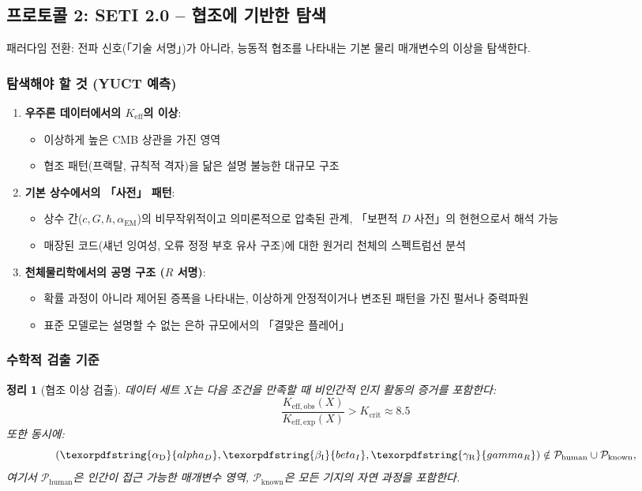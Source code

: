 \documentclass[11pt,a4paper]{article}
\newtheorem{theorem}{정리}
\DeclareRobustCommand{\alD}{\texorpdfstring{\ensuremath{\alpha_{\mathrm{D}}}}{alpha_D}}
\DeclareRobustCommand{\beI}{\texorpdfstring{\ensuremath{\beta_{\mathrm{I}}}}{beta_I}}
\DeclareRobustCommand{\gaR}{\texorpdfstring{\ensuremath{\gamma_{\mathrm{R}}}}{gamma_R}}
\newcommand{\eff}{\mathrm{eff}}
\newcommand{\Ke}{K_{\eff}}
\newcommand{\Keobs}{K_{\eff,\mathrm{obs}}}
\newcommand{\Keexp}{K_{\eff,\mathrm{exp}}}
\newcommand{\Kcrit}{K_{\mathrm{crit}}}
\begin{document}
	\subsection{프로토콜 2: SETI 2.0 -- 협조에 기반한 탐색}
	
	패러다임 전환: 전파 신호(「기술 서명」)가 아니라, 능동적 협조를 나타내는 기본 물리 매개변수의 이상을 탐색한다.
	
	\subsubsection{탐색해야 할 것 (YUCT 예측)}
	
	\begin{enumerate}
		\item \textbf{우주론 데이터에서의 \(\Ke\)의 이상}:
		\begin{itemize}
			\item 이상하게 높은 CMB 상관을 가진 영역
			\item 협조 패턴(프랙탈, 규칙적 격자)을 닮은 설명 불능한 대규모 구조
		\end{itemize}
		
		\item \textbf{기본 상수에서의 「사전」 패턴}:
		\begin{itemize}
			\item 상수 간(\(c, G, \hbar, \alpha_{\mathrm{EM}}\))의 비무작위적이고 의미론적으로 압축된 관계, 「보편적 \(D\) 사전」의 현현으로서 해석 가능
			\item 매장된 코드(섀넌 잉여성, 오류 정정 부호 유사 구조)에 대한 원거리 천체의 스펙트럼선 분석
		\end{itemize}
		
		\item \textbf{천체물리학에서의 공명 구조 (\(R\) 서명)}:
		\begin{itemize}
			\item 확률 과정이 아니라 제어된 증폭을 나타내는, 이상하게 안정적이거나 변조된 패턴을 가진 펄서나 중력파원
			\item 표준 모델로는 설명할 수 없는 은하 규모에서의 「결맞은 플레어」
		\end{itemize}
	\end{enumerate}
	
	\subsubsection{수학적 검출 기준}
	
	\begin{theorem}[협조 이상 검출]
		데이터 세트 \(X\)는 다음 조건을 만족할 때 비인간적 인지 활동의 증거를 포함한다:
		\[
		\frac{\Keobs(X)}{\Keexp(X)} > \Kcrit \approx 8.5
		\]
		또한 동시에:
		\[
		(\alD, \beI, \gaR) \notin \mathcal{P}_{\mathrm{human}} \cup \mathcal{P}_{\mathrm{known}},
		\]
		여기서 \(\mathcal{P}_{\mathrm{human}}\)은 인간이 접근 가능한 매개변수 영역, \(\mathcal{P}_{\mathrm{known}}\)은 모든 기지의 자연 과정을 포함한다.
	\end{theorem}
	
\end{document}
